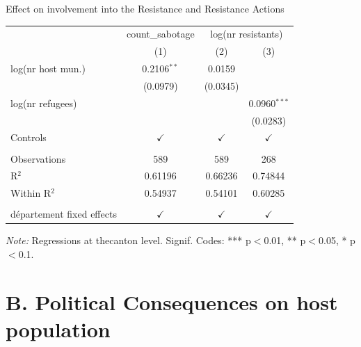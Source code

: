 \documentclass[xcolor=dvipsnames, aspectratio=169]{beamer}
\begin{document}
\begin{frame}{Effect on involvement into the Resistance and Resistance Actions}
\begingroup
\centering
\begin{tabular}{lccc}
   \toprule
    & count\_sabotage & \multicolumn{2}{c}{log(nr resistants)}\\
                             & (1)           & (2)           & (3)\\  
   \midrule 
   log(nr host mun.)         & 0.2106$^{**}$ & 0.0159        &   \\   
                             & (0.0979)      & (0.0345)      &   \\   
   log(nr refugees)          &               &               & 0.0960$^{***}$\\   
                             &               &               & (0.0283)\\   
   Controls                  & $\checkmark$  & $\checkmark$  & $\checkmark$\\   
    \\
   Observations              & 589           & 589           & 268\\  
   R$^2$                     & 0.61196       & 0.66236       & 0.74844\\  
   Within R$^2$              & 0.54937       & 0.54101       & 0.60285\\  
    \\
   département fixed effects & $\checkmark$  & $\checkmark$  & $\checkmark$\\   
   \bottomrule
\end{tabular}
 
\par \raggedright 
\begin{minipage}{\linewidth}
              \vspace{0.8em}
              \justifying \footnotesize
              \textit{Note:}  Regressions at thecanton level.
              Signif. Codes: *** p$<$0.01, ** p$<$0.05, * p$<$0.1.
            \end{minipage}
\par\endgroup
\end{frame}













\section{B. Political Consequences on host population}
\end{document}

